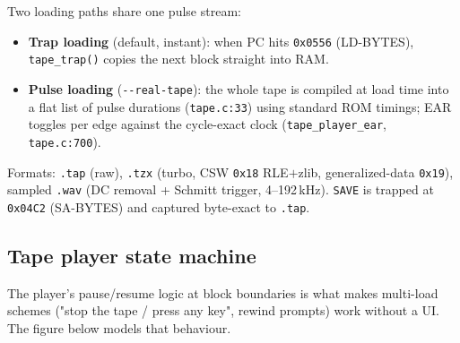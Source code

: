 \documentclass[11pt,a4paper]{article}
\begin{document}
Two loading paths share one pulse stream:

\begin{itemize}
\item \textbf{Trap loading} (default, instant): when PC hits \texttt{0x0556}
      (LD-BYTES), \texttt{tape\_trap()} copies the next block straight into RAM.
\item \textbf{Pulse loading} (\texttt{-{}-real-tape}): the whole tape is
      compiled at load time into a flat list of pulse durations
      (\texttt{tape.c:33}) using standard ROM timings; EAR toggles per edge
      against the cycle-exact clock (\texttt{tape\_player\_ear},
      \texttt{tape.c:700}).
\end{itemize}

Formats: \texttt{.tap} (raw), \texttt{.tzx} (turbo, CSW \texttt{0x18}
RLE$+$zlib, generalized-data \texttt{0x19}), sampled \texttt{.wav}
(DC removal + Schmitt trigger, 4--192\,kHz). \texttt{SAVE} is trapped at
\texttt{0x04C2} (SA-BYTES) and captured byte-exact to \texttt{.tap}.

\subsection{Tape player state machine}
The player's pause/resume logic at block boundaries is what makes multi-load
schemes ("stop the tape / press any key", rewind prompts) work without a UI.
The figure below models that behaviour.
\end{document}

